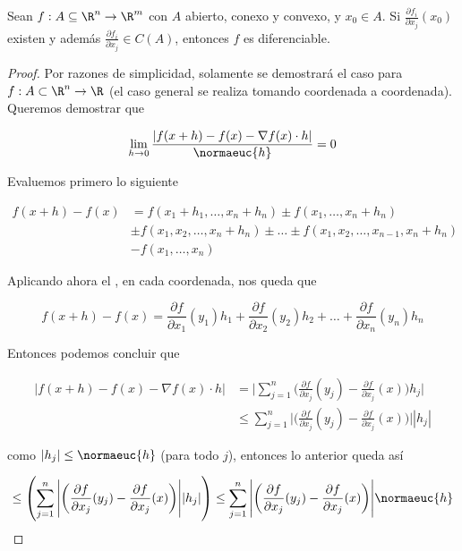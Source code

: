 \begin{teo}
    Sean $f: A \subseteq \R^n \rightarrow \R^m$ con $A$ abierto, conexo y convexo, y $x_0 \in A$. Si $\frac{\partial f_i}{\partial x_j}(x_0)$ existen y además $\frac{\partial f_i}{\partial x_j} \in C(A)$, entonces $f$ es diferenciable.
\end{teo}

\begin{proof}
    Por razones de simplicidad, solamente se demostrará el caso para $f: A \subset \R^n \rightarrow \R$ (el caso general se realiza tomando coordenada a coordenada). Queremos demostrar que
    
    \[
    \lim_{h \to 0} \frac{\left| f(x + h) - f(x) - \nabla f(x) \cdot h \right|}{\normaeuc{h}} = 0
    \]
    
    Evaluemos primero lo siguiente
    
    \begin{align*}
        f(x + h) - f(x) &= f(x_1 + h_1, \dots, x_n + h_n) \pm f(x_1, \dots, x_n + h_n) \\
            &\pm f(x_1, x_2, \dots, x_n + h_n) \pm \dots \pm f(x_1, x_2, \dots, x_{n-1}, x_n + h_n) \\
            &- f(x_1, \dots, x_n)
    \end{align*}
    
    Aplicando ahora el \TVM, en cada coordenada, nos queda que
    
    \[
    f(x + h) - f(x) = \frac{\partial f}{\partial x_1}(y_1)h_1 + \frac{\partial f}{\partial x_2}(y_2)h_2 + \dots + \frac{\partial f}{\partial x_n}(y_n)h_n
    \]
    
    Entonces podemos concluir que
    
    \begin{align*}
        \big| f(x + h) - f(x) - \nabla f(x) \cdot h \big| &= \Bigg| \sum_{j=1}^n \bigg( \frac{\partial f}{\partial x_j} (y_j) - \frac{\partial f}{\partial x_j} (x) \bigg) h_j \Bigg| \\
            &\leq \sum_{j=1}^n \Bigg| \bigg( \frac{\partial f}{\partial x_j} (y_j) - \frac{\partial f}{\partial x_j} (x) \bigg) \Bigg| |h_j|
    \end{align*}
    
    \noindent como $|h_j| \leq \normaeuc{h}$ (para todo $j$), entonces lo anterior queda así
    
    \begin{equation}\label{eq:2.1.1}
        \leq \left(\sum_{j=1}^n \Bigg| \bigg( \frac{\partial f}{\partial x_j} (y_j) - \frac{\partial f}{\partial x_j} (x) \bigg) \Bigg| |h_j|\right) \leq \sum_{j=1}^n \Bigg| \bigg( \frac{\partial f}{\partial x_j} (y_j) - \frac{\partial f}{\partial x_j} (x) \bigg) \Bigg| \normaeuc{h}
    \end{equation}
    

\end{proof}
